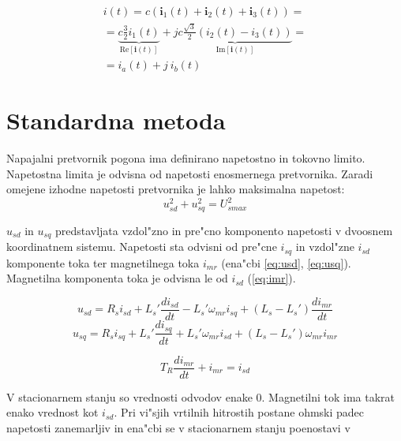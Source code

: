 \documentclass[journal,a4paper,twoside]{sty/IEEEtran}
\begin{document}
\begin{equation}
\begin{multlined}
{i}(t)= c (\textbf{i}_1(t)+\textbf{i}_2(t)+\textbf{i}_3(t))=\\
 = \underbrace{c \frac{3}{2}i_1(t)}_{\mathrm{Re}{[\textbf{i}(t)]}}+j \underbrace{c \frac{\sqrt{3}}{2}(i_2(t)-i_3(t))}_{\mathrm{Im}{[\textbf{i}(t)]}}= \\
  = i_a(t)+j\:i_b(t)\qquad \qquad \qquad\qquad\quad
  \end{multlined}
\end{equation}






\section{Standardna metoda}
Napajalni pretvornik pogona ima definirano napetostno in tokovno limito. Napetostna limita je odvisna od napetosti enosmernega pretvornika.\cite{vas}
Zaradi omejene izhodne napetosti pretvornika je lahko maksimalna napetost:
\begin{equation}
u_{sd}^2+u_{sq}^2= U_{smax}^2
\label{eq:napetostna_limita_osnovna}
\end{equation}

$u_{sd}$ in $u_{sq}$ predstavljata vzdol"zno in pre"cno komponento  napetosti v dvoosnem koordinatnem sistemu. Napetosti sta odvisni od pre"cne $i_{sq}$ in vzdol"zne $i_{sd}$ komponente toka ter magnetilnega  toka $i_{mr}$ (ena"cbi \ref{eq:usd}, \ref{eq:usq}). Magnetilna komponenta toka je odvisna le od $i_{sd}$ (\ref{eq:imr}).\cite{servopogoni}

\begin{equation}
u_{sd}= R_s i_{sd}+L_s' \frac{di_{sd}}{dt}- L_s' \omega_{mr} i_{sq}+(L_s-L_s')\frac{di_{mr}}{dt}
\label{eq:usd}
\end{equation}
\begin{equation}
u_{sq}= R_s i_{sq}+L_s' \frac{di_{sq}}{dt} + L_s' \omega_{mr}i_{sd}+(L_s-L_s')\omega_{mr}i_{mr}
\label{eq:usq}
\end{equation}

\begin{equation}
T_R\frac{di_{mr}}{dt}+i_{mr} =i_{sd}
\label{eq:imr}
\end{equation}


V stacionarnem stanju so vrednosti odvodov enake 0. Magnetilni tok ima takrat enako vrednost kot $i_{sd}$. Pri vi"sjih vrtilnih hitrostih postane ohmski padec napetosti zanemarljiv in ena"cbi se v stacionarnem stanju poenostavi v
\end{document}
